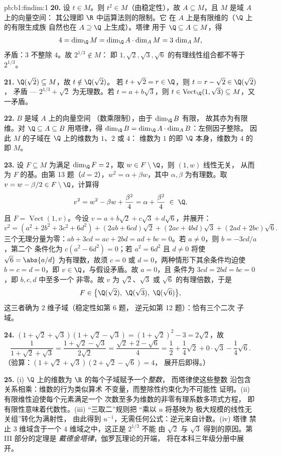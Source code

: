 \begin{solution}{pb:b1:findim:1}
\textbf{20.} 设 $t \in M$。则 $t^2 \in M$（由稳定性），故
$A \subseteq M$，且 $M$ 是域 $A$ 上的向量空间：
其公理即 $\R$ 中运算法则的限制。它
在 $A$ 上是有限维的（$\Q$ 上的有限生成族
自然也在 $A \supseteq \Q$ 上生成）。塔律
用于 $\Q \subseteq A \subseteq M$，得
\[
4 = \dim_\Q M = \dim_\Q A \cdot \dim_A M = 3\,\dim_A M ,
\]
矛盾：$3$ 不整除 $4$。故 $2^{1/3} \notin M$：
即 $1, \sqrt2, \sqrt3, \sqrt6$ 的有理线性组合都不等于
$2^{1/3}$。

\textbf{21.} $\Q(\sqrt2) \subseteq M$，故 $t \notin \Q(\sqrt2)$。
若 $t + \sqrt2 = r \in \Q$，则 $t = r - \sqrt2 \in \Q(\sqrt2)$，
矛盾 --- $2^{1/3} + \sqrt2$ 为无理数。若 $t = a +
b\sqrt3$，则 $t \in \operatorname{Vect}_\Q(1, \sqrt3) \subseteq
M$，又一矛盾。

\textbf{22.} $B$ 是域 $A$ 上的向量空间
（数乘限制），由于 $\dim_\Q B$ 有限，
故其亦为有限维。对 $\Q \subseteq A \subseteq B$ 用塔律，得
$\dim_\Q B = \dim_\Q A \cdot \dim_A B$：左侧因子整除。
因此 $M$ 的子域在 $\Q$ 上的维数为 $1$、$2$ 或 $4$：
维数为 $1$ 的即 $\Q$ 本身，维数为 $4$ 的即 $M$。

\textbf{23.} 设 $F \subseteq M$ 为满足 $\dim_\Q F =
2$，取 $w \in F \setminus \Q$，则 $(1, w)$ 线性无关，
从而为 $F$ 的基。由第 13 题（$d = 2$），$w^2 = \alpha + \beta w$，其中
$\alpha, \beta$ 为有理数。取 $v = w - \beta/2 \in F
\setminus \Q$，计算得
\[
v^2 = w^2 - \beta w + \frac{\beta^2}4 = \alpha + \frac{\beta^2}4
\;\in\; \Q,
\]
且 $F = \operatorname{Vect}(1, v)$。今设 $v = a + b\sqrt2 +
c\sqrt3 + d\sqrt6$，并展开：
\[
v^2 = (a^2 + 2b^2 + 3c^2 + 6d^2)
+ (2ab + 6cd)\sqrt2 + (2ac + 4bd)\sqrt3 + (2ad + 2bc)\sqrt6 .
\]
三个无理分量为零：$ab + 3cd = ac + 2bd =
ad + bc = 0$。若 $a \neq 0$，则 $b = -3cd/a$，第二个
条件化为 $c(a^2 - 6d^2) = 0$；若 $a^2 = 6d^2$ 且 $d
\neq 0$ 将使 $\sqrt6 = \abs{a/d}$ 为有理数，故须 $c = 0$
或 $d = 0$，两种情形下其余条件均迫使 $b =
c = d = 0$，即 $v \in \Q$，与假设矛盾。故 $a = 0$，且
条件为 $3cd = 2bd = bc = 0$，即 $b, c, d$ 中至多一个
非零。故 $v$ 为 $\sqrt2$、$\sqrt3$
或 $\sqrt6$ 的有理倍数，于是
\[
F \in \bigl\{\Q(\sqrt2),\ \Q(\sqrt3),\ \Q(\sqrt6)\bigr\} ,
\]
这三者确为 $2$ 维子域（稳定性如第 6 题，
逆元如第 12 题）：恰有三个二次
子域。

\textbf{24.} $(1 + \sqrt2 + \sqrt3)(1 + \sqrt2 - \sqrt3) = (1 +
\sqrt2)^2 - 3 = 2\sqrt2$，故
\[
\frac1{1 + \sqrt2 + \sqrt3}
= \frac{1 + \sqrt2 - \sqrt3}{2\sqrt2}
= \frac{\sqrt2 + 2 - \sqrt6}{4}
= \frac12 + \frac14\sqrt2 + 0\cdot\sqrt3 - \frac14\sqrt6 .
\]
（验算：$(1 + \sqrt2 + \sqrt3)(2 + \sqrt2 - \sqrt6) = 4$，
展开后即得。）

\textbf{25.} (i) $\Q$ 上的维数为 $\R$ 的每个子域赋予一个\emph{整数}，
而塔律使这些整数
沿包含关系相乘：维数的行为类似算术
不变量，而整除性约束化为不可能性
证明。(ii) 有限维性迫使每个元素满足一个
次数至多为维数的非零有理系数多项式方程，
即有限性意味着代数性。(iii) “三取二”规则把
“乘以 $u$ 将基映为
极大规模的线性无关组”转化为满射性，
由此得到 $u^{-1}$，无需任何公式：逆元来自计数。(iv) 塔律
禁止 $3$ 维域含于一个
$4$ 维域之中，这正是 $2^{1/3}$ 不能
由 $\sqrt2$ 与 $\sqrt3$ 得到的原因。第 III 部分的定理是
\emph{戴德金塔律}，伽罗瓦理论的开端，
将在本科三年级分册中展开。
\end{solution}
